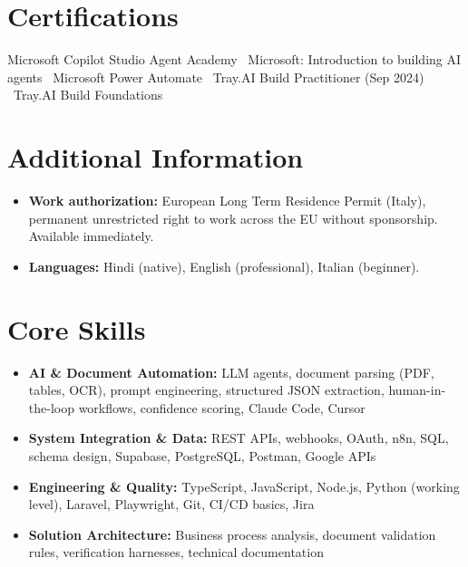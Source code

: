 \documentclass[a4paper,11pt]{article}
\begin{document}
\section{Certifications}
Microsoft Copilot Studio Agent Academy \textbullet\ Microsoft: Introduction to building AI agents \textbullet\ Microsoft Power Automate \textbullet\ Tray.AI Build Practitioner (Sep 2024) \textbullet\ Tray.AI Build Foundations

\section{Additional Information}
\begin{itemize}
 \item \textbf{Work authorization:} European Long Term Residence Permit (Italy), permanent unrestricted right to work across the EU without sponsorship. Available immediately.
 \item \textbf{Languages:} Hindi (native), English (professional), Italian (beginner).
\end{itemize}

\section{Core Skills}
\begin{itemize}
 \item \textbf{AI \& Document Automation:} LLM agents, document parsing (PDF, tables, OCR), prompt engineering, structured JSON extraction, human-in-the-loop workflows, confidence scoring, Claude Code, Cursor
 \item \textbf{System Integration \& Data:} REST APIs, webhooks, OAuth, n8n, SQL, schema design, Supabase, PostgreSQL, Postman, Google APIs
 \item \textbf{Engineering \& Quality:} TypeScript, JavaScript, Node.js, Python (working level), Laravel, Playwright, Git, CI/CD basics, Jira
 \item \textbf{Solution Architecture:} Business process analysis, document validation rules, verification harnesses, technical documentation
\end{itemize}
\end{document}
